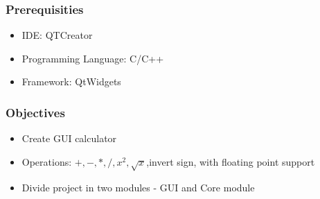 \subsubsection{Prerequisities}
\begin{itemize}
    \item IDE: QTCreator
    \item Programming Language: C/C++
    \item Framework: QtWidgets
\end{itemize}

\subsubsection{Objectives}
\begin{itemize}
    \item Create GUI calculator
    \item Operations: $+,-,*,/,x^2,\sqrt{x} $,invert sign, with floating point support
    \item Divide project in two modules - GUI and Core module
\end{itemize}
